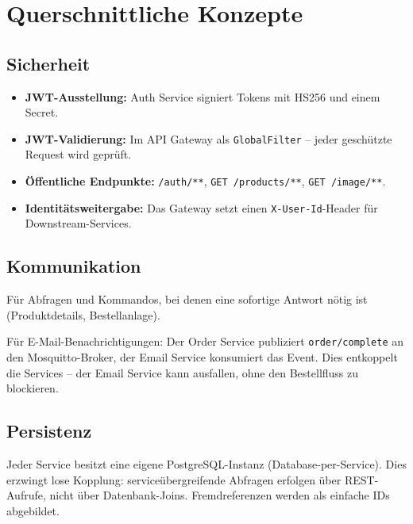 \documentclass[11pt,a4paper]{article}
\begin{document}
\section{Querschnittliche Konzepte}

\subsection{Sicherheit}

\begin{itemize}[leftmargin=1.5em, itemsep=2pt]
  \item \textbf{JWT-Ausstellung:} Auth Service signiert Tokens mit
        HS256 und einem Secret.
  \item \textbf{JWT-Validierung:} Im API Gateway als \texttt{GlobalFilter}
        -- jeder gesch\"utzte Request wird gepr\"uft.
  \item \textbf{\"Offentliche Endpunkte:} \texttt{/auth/**},
        \texttt{GET /products/**}, \texttt{GET /image/**}.
  \item \textbf{Identit\"atsweitergabe:} Das Gateway setzt einen
        \texttt{X-User-Id}-Header f\"ur Downstream-Services.
\end{itemize}

\subsection{Kommunikation}

\begin{description}[leftmargin=1.5em, itemsep=2pt]
  \item[REST (synchron)] F\"ur Abfragen und Kommandos, bei denen eine
        sofortige Antwort n\"otig ist (Produktdetails, Bestellanlage).
  \item[MQTT (asynchron, Publish/Subscribe)] F\"ur
        E-Mail-Benachrichtigungen: Der Order Service publiziert
        \texttt{order/complete} an den Mosquitto-Broker, der Email
        Service konsumiert das Event. Dies entkoppelt die Services -- der
        Email Service kann ausfallen, ohne den Bestellfluss zu blockieren.
\end{description}

\subsection{Persistenz}

Jeder Service besitzt eine eigene PostgreSQL-Instanz
(Database-per-Service). Dies erzwingt lose Kopplung:
service\"ubergreifende Abfragen erfolgen \"uber REST-Aufrufe, nicht \"uber
Datenbank-Joins. Fremdreferenzen werden als einfache IDs abgebildet.
\end{document}
